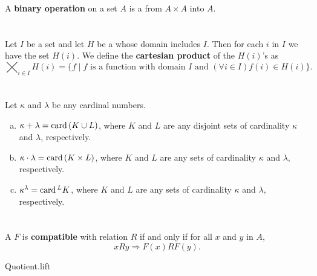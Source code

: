 \documentclass{report}
\begin{document}
  A \textbf{binary operation} on a set $A$ is a  from
    $A \times A$ into $A$.

\section{}%

  Let $I$ be a set and let $H$ be a  whose domain includes
    $I$.
  Then for each $i$ in $I$ we have the set $H(i)$.
  We define the \textbf{cartesian product} of the $H(i)$'s as
    $$\bigtimes_{i \in I} H(i) = \{f \mid
      f \text{ is a function with domain } I \text{ and }
        (\forall i \in I) f(i) \in H(i)\}.$$


\section{}%

  Let $\kappa$ and $\lambda$ be any cardinal numbers.
  \begin{enumerate}[(a)]
    \item $\kappa + \lambda = \mathop{\text{card}}{(K \cup L)}$, where $K$ and $L$ are any
      disjoint sets of cardinality $\kappa$ and $\lambda$, respectively.
    \item $\kappa \cdot \lambda = \mathop{\text{card}}{(K \times L)}$, where $K$ and $L$ are
      any sets of cardinality $\kappa$ and $\lambda$, respectively.
    \item $\kappa^\lambda = \mathop{\text{card}}{^L{K}}$, where $K$ and $L$ are any sets of
      cardinality $\kappa$ and $\lambda$, respectively.
  \end{enumerate}

\section{}%

  A  $F$ is \textbf{compatible} with relation $R$ if and
    only if for all $x$ and $y$ in $A$,
    $$xRy \Rightarrow F(x)RF(y).$$

    {Quotient.lift}

\section{}%
\end{document}
